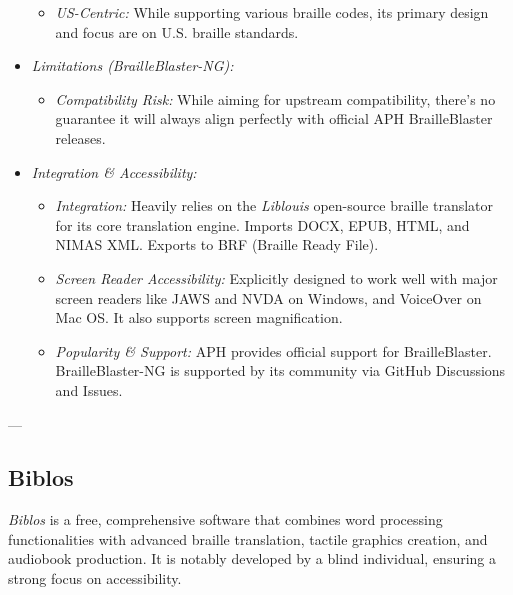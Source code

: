 \begin{itemize}
\begin{itemize}
        \item \emph{US-Centric:} While supporting various braille codes, its primary design and focus are on U.S. braille standards.
    \end{itemize}
    \item \emph{Limitations (BrailleBlaster-NG):}
    \begin{itemize}
        \item \emph{Compatibility Risk:} While aiming for upstream compatibility, there's no guarantee it will always align perfectly with official APH BrailleBlaster releases.
    \end{itemize}
    \item \emph{Integration \& Accessibility:}
    \begin{itemize}
        \item \emph{Integration:} Heavily relies on the \emph{Liblouis} open-source braille translator for its core translation engine. Imports DOCX, EPUB, HTML, and NIMAS XML. Exports to BRF (Braille Ready File).
        \item \emph{Screen Reader Accessibility:} Explicitly designed to work well with major screen readers like JAWS and NVDA on Windows, and VoiceOver on Mac OS. It also supports screen magnification.
        \item \emph{Popularity \& Support:} APH provides official support for BrailleBlaster. BrailleBlaster-NG is supported by its community via GitHub Discussions and Issues.
    \end{itemize}
\end{itemize}

---

\subsection{Biblos}
\emph{Biblos} is a free, comprehensive software that combines word processing functionalities with advanced braille translation, tactile graphics creation, and audiobook production. It is notably developed by a blind individual, ensuring a strong focus on accessibility.

